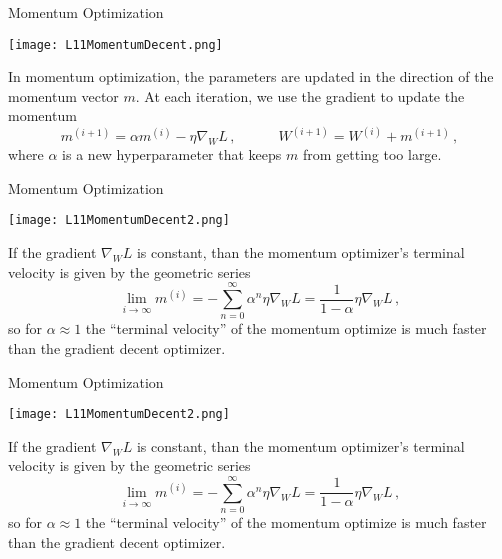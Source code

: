 \documentclass[10pt, table, dvipsnames,xcdraw,handout]{beamer}
\begin{document}
\begin{frame}[fragile]{Momentum Optimization}
  \begin{minipage}[t][0.5\textheight][t]{\textwidth}
	\centering \texttt{[image: L11MomentumDecent.png]} 
  \end{minipage}
  \vfill
\begin{minipage}[t][0.5\textheight][t]{\textwidth}
In momentum optimization, the parameters are updated in the direction of the momentum vector $m$. At each iteration, we use the gradient to update the momentum
$$
m^{(i+1)}= \alpha m^{(i)} -\eta \nabla_{W} L\,,\hspace{3em} W^{(i+1)} = W^{(i)}+m^{(i+1)}\,,
$$
where $\alpha$ is a new hyperparameter that keeps $m$ from getting too large. 
\end{minipage}
\end{frame}




\begin{frame}[fragile]{Momentum Optimization}
  \begin{minipage}[t][0.5\textheight][t]{\textwidth}
	\centering \texttt{[image: L11MomentumDecent2.png]} 
  \end{minipage}
  \vfill
\begin{minipage}[t][0.5\textheight][t]{\textwidth}
If the gradient $ \nabla_{W} L$ is constant, than the momentum optimizer's terminal velocity is given by the geometric series
$$
\lim_{i\to \infty} m^{(i)} = -\sum_{n=0}^\infty \alpha^n \eta  \nabla_{W} L = \frac{1}{1-\alpha}  \eta \nabla_{W} L\,,
$$
so for $\alpha \approx 1$ the ``terminal velocity'' of the momentum optimize is much faster than the gradient decent optimizer. 
\end{minipage}
\end{frame}





\begin{frame}[fragile]{Momentum Optimization}
  \begin{minipage}[t][0.5\textheight][t]{\textwidth}
	\centering \texttt{[image: L11MomentumDecent2.png]} 
  \end{minipage}
  \vfill
\begin{minipage}[t][0.5\textheight][t]{\textwidth}
If the gradient $ \nabla_{W} L$ is constant, than the momentum optimizer's terminal velocity is given by the geometric series
$$
\lim_{i\to \infty} m^{(i)} = -\sum_{n=0}^\infty \alpha^n \eta  \nabla_{W} L = \frac{1}{1-\alpha}  \eta \nabla_{W} L\,,
$$
so for $\alpha \approx 1$ the ``terminal velocity'' of the momentum optimize is much faster than the gradient decent optimizer. 
\end{minipage}
\end{frame}
\end{document}
